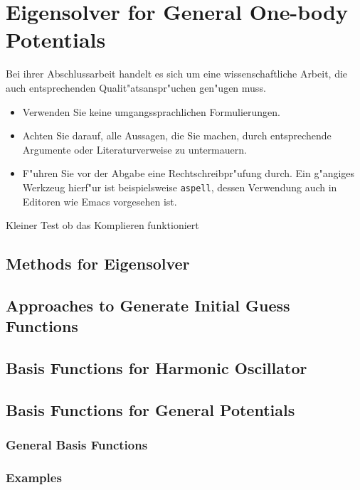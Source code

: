 \chapter{Eigensolver for General One-body Potentials}
\label{c:inhalt}



Bei ihrer Abschlussarbeit handelt es sich um eine
  wissenschaftliche Arbeit, die auch entsprechenden
  Qualit"atsanspr"uchen gen"ugen muss.
  \begin{itemize}
  \item Verwenden Sie keine umgangssprachlichen Formulierungen.
  \item Achten Sie darauf, alle Aussagen, die Sie machen, durch
    entsprechende Argumente oder Literaturverweise zu untermauern.
  \item F"uhren Sie vor der Abgabe eine Rechtschreibpr"ufung durch.
    Ein g"angiges Werkzeug hierf"ur ist beispielsweise
    \texttt{aspell}, dessen Verwendung auch in Editoren wie Emacs
    vorgesehen ist.
  \end{itemize}


Kleiner Test ob das Komplieren funktioniert
\section{Methods for Eigensolver}
\section{Approaches to Generate Initial Guess Functions}

\section{Basis Functions for Harmonic Oscillator}
\section{Basis Functions for General Potentials}
\subsection{General Basis Functions}
\subsection{Examples}